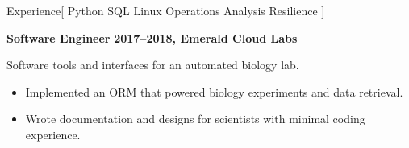 \documentclass[11pt,a4paper]{article}
\newcommand{\archive}{https://web.archive.org/web}
\newcommand{\FadleyGroup}{
  \href{\archive/20201001085257/http://fadley.physics.ucdavis.edu/}
       {Fadley Group}
}
\begin{document}
\begin{mysection}{Experience}[
    Python
    \textbullet{} SQL
    \textbullet{} Linux
    \textbullet{} Operations
    \textbullet{} Analysis
    \textbullet{} Resilience
]
\begin{addmargin}[0.5em]{0em}
%
%

  \end{addmargin}
  \medskip


  \begin{addmargin}[0.5em]{0em}
    {\large\bfseries Software Engineer}%
    \hfill {\bfseries 2017--2018, Emerald Cloud Labs}%
    \begin{adjustwidth}{1ex}{0ex}
      Software tools and interfaces for an automated biology lab.

      \begin{itemize}
        [label=-, topsep=0pt, itemsep=0.5ex, parsep=0pt, leftmargin=1em]
      \item Implemented an ORM that powered biology experiments and data
            retrieval.
      \item Wrote documentation and designs for scientists with minimal coding
            experience.
      \end{itemize}
    \end{adjustwidth}
  \end{addmargin}





\end{mysection}
\end{document}
